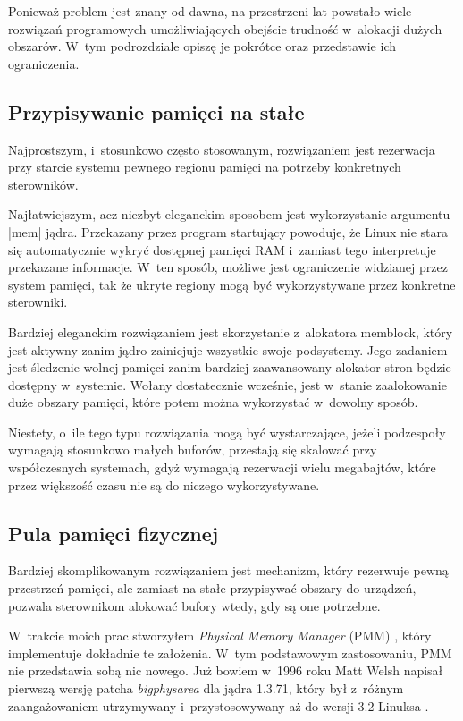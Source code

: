 Ponieważ problem jest znany od dawna, na przestrzeni lat powstało
wiele rozwiązań programowych umożliwiających obejście trudność
w~alokacji dużych obszarów.  W~tym podrozdziale opiszę je pokrótce
oraz przedstawie ich ograniczenia.

\subsection{Przypisywanie pamięci na stałe}

Najprostszym, i~stosunkowo często stosowanym, rozwiązaniem jest
rezerwacja przy starcie systemu pewnego regionu pamięci na potrzeby
konkretnych sterowników.

Najłatwiejszym, acz niezbyt eleganckim sposobem jest wykorzystanie
argumentu \code|mem| jądra.  Przekazany przez program startujący
powoduje, że Linux nie stara się automatycznie wykryć dostępnej
pamięci RAM i~zamiast tego interpretuje przekazane informacje.  W~ten
sposób, możliwe jest ograniczenie widzianej przez system pamięci, tak
że ukryte regiony mogą być wykorzystywane przez konkretne sterowniki.

Bardziej eleganckim rozwiązaniem jest skorzystanie z~alokatora
memblock, który jest aktywny zanim jądro zainicjuje wszystkie swoje
podsystemy.  Jego zadaniem jest śledzenie wolnej pamięci zanim
bardziej zaawansowany alokator stron będzie dostępny w~systemie.
Wołany dostatecznie wcześnie, jest w~stanie zaalokowanie duże obszary
pamięci, które potem można wykorzystać w~dowolny sposób.

Niestety, o~ile tego typu rozwiązania mogą być wystarczające, jeżeli
podzespoły wymagają stosunkowo małych buforów, przestają się skalować
przy współczesnych systemach, gdyż wymagają rezerwacji wielu
megabajtów, które przez większość czasu nie są do niczego
wykorzystywane.

\subsection{Pula pamięci fizycznej}

Bardziej skomplikowanym rozwiązaniem jest mechanizm, który rezerwuje
pewną przestrzeń pamięci, ale zamiast na stałe przypisywać obszary do
urządzeń, pozwala sterownikom alokować bufory wtedy, gdy są one
potrzebne.

W~trakcie moich prac stworzyłem \textit{Physical Memory Manager} (PMM)
\autocite{patch:pmm}, który implementuje dokładnie te założenia. W~tym
podstawowym zastosowaniu, PMM nie przedstawia sobą nic nowego.  Już
bowiem w~1996 roku Matt Welsh napisał pierwszą wersję patcha
\emph{bigphysarea} dla jądra 1.3.71, który był z~różnym zaangażowaniem
utrzymywany i~przystosowywany aż do wersji 3.2 Linuksa
\autocite{patch:bigphys}.

